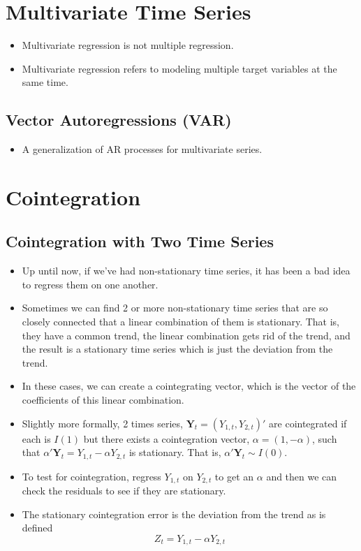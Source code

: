 \documentclass[11pt]{article}
\begin{document}
\section{Multivariate Time Series}
\begin{itemize}
    \item Multivariate regression is not multiple regression.
    \item Multivariate regression refers to modeling multiple target variables at the same time. 
\end{itemize}

\subsection{Vector Autoregressions (VAR)}
\begin{itemize}
    \item A generalization of AR processes for multivariate series. 
\end{itemize}


\section{Cointegration}
\subsection{Cointegration with Two Time Series}
\begin{itemize}
    \item Up until now, if we've had non-stationary time series, it has been a bad idea to 
    regress them on one another. 
    \item Sometimes we can find 2 or more non-stationary time series that are so closely 
    connected that a linear combination of them is stationary. That is, they have a common 
    trend, the linear combination gets rid of the trend, and the result is a stationary time 
    series which is just the deviation from the trend. 
    \item In these cases, we can create a cointegrating vector, which is the vector of the 
    coefficients of this linear combination. 
    \item Slightly more formally, 2 times series, $ \boldsymbol{Y}_t = (Y_{1,t}, Y_{2,t})'$ 
    are cointegrated if each is $I(1)$ but there exists a cointegration vector, $\alpha = 
    (1, -\alpha)$, such that $ \alpha'\boldsymbol{Y}_t = Y_{1,t} - \alpha Y_{2,t}$ is 
    stationary. That is, $\alpha'\boldsymbol{Y}_t \sim I(0)$.
    \item To test for cointegration, regress $Y_{1,t}$ on $Y_{2,t}$ to get an $\alpha$ and then 
    we can check the residuals to see if they are stationary. %
    \item The stationary cointegration error is the deviation from the trend as is defined 
    \[Z_t =  Y_{1,t} - \alpha Y_{2,t} \]
\end{itemize}
\end{document}
